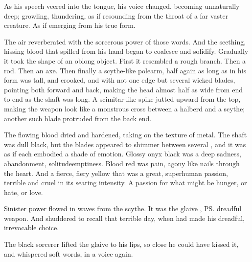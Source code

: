 \begin{garbage}
As his speech veered into the \TrueDraconic{} tongue, his voice changed, becoming unnaturally deep; growling, thundering, as if resounding from the throat of a far vaster creature. 
As if emerging from his true form. 

The air reverberated with the sorcerous power of those words. 
And the seething, hissing blood that spilled from his hand began to coalesce and solidify. 
Gradually it took the shape of an oblong object. 
First it resembled a rough branch. 
Then a rod. 
Then an axe. 
Then finally a scythe-like polearm, half again as long as \Ishnaruchaefir{} in his \scathaese{} form was tall, and crooked, and with not one edge but several wicked blades, pointing both forward and back, making the head almost half as wide from end to end as the shaft was long. 
A scimitar-like spike jutted upward from the top, making the weapon look like a monstrous cross between a halberd and a scythe; another such blade protruded from the back end. 

The flowing blood dried and hardened, taking on the texture of metal. 
The shaft was dull black, but the blades appeared to shimmer between several \colours, and it was as if each \colour embodied a shade of emotion. 
Glossy onyx black was a deep sadness, abandonment, solitude\prikker emptiness. 
Blood red was pain, agony like nails through the heart. 
And a fierce, fiery yellow that was a great, superhuman passion, terrible and cruel in its searing intensity. 
A passion for what might be hunger, or hate, or love. 

Sinister power flowed in waves from the scythe. 
It was the glaive \AeocrithRystessakhin, \ps{\Ishnaruchaefir}{} dreadful weapon. 
And \Criseis{} shuddered to recall that terrible day, when \QuessanthIshnaruchaefir{} had made his dreadful, irrevocable choice. 

The black sorcerer lifted the glaive to his lips, so close he could have kissed it, and whispered soft words, in a \scathaese{} voice again. 


\end{garbage}
